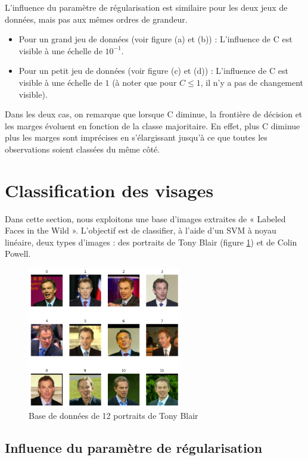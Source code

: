 \documentclass[a4paper,12pt]{article}
\begin{document}
L'influence du paramètre de régularisation est similaire pour les deux jeux de données, mais pas aux mêmes ordres de grandeur.

\begin{itemize}
    \item Pour un grand jeu de données (voir figure (a) et (b)) : L'influence de C est visible à une échelle de $10^{-1}$.
    \item Pour un petit jeu de données (voir figure (c) et (d)) : L'influence de C est visible à une échelle de $1$ (à noter que pour $C \leq 1$, il n'y a pas de changement visible).
\end{itemize}

Dans les deux cas, on remarque que lorsque C diminue, la frontière de décision et les marges évoluent en fonction de la classe majoritaire.
En effet, plus C diminue plus les marges sont imprécises en s'élargissant jusqu'à ce que toutes les observations soient classées du même côté.
\newpage

\section{Classification des visages}

Dans cette section, nous exploitons une base d'images extraites de « Labeled Faces in the Wild ».
L'objectif est de classifier, à l'aide d'un SVM à noyau linéaire, deux types d'images : des portraits de Tony Blair (figure \ref{fig : visages}) et de Colin Powell. 


\begin{figure}[H]
    \centering
    \includegraphics[width=0.6\textwidth]{Images/visages.png}
    \caption{Base de données de 12 portraits de Tony Blair}\label{fig : visages}
\end{figure}

\subsection{Influence du paramètre de régularisation}
\end{document}
